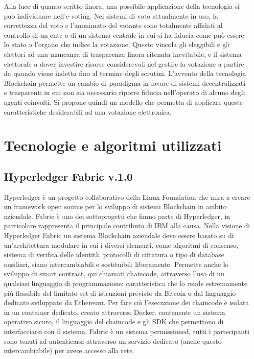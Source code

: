 Alla luce di quanto scritto finora, una possibile applicazione della tecnologia si può individuare nell'e-voting. Nei sistemi di voto attualmente in uso, la correttezza del voto e l’anonimato del votante sono totalmente affidati al controllo di un ente o di un sistema centrale in cui si ha fiducia come può essere lo stato o l'organo che indice la votazione. Questo vincola gli eleggibili e gli elettori ad una mancanza di trasparenza finora ritenuta inevitabile, e il sistema elettorale a dover investire risorse considerevoli nel gestire la votazione a partire da quando viene indetta fino al termine degli scrutini. L’avvento della tecnologia Blockchain permette un cambio di paradigma in favore di sistemi decentralizzati e trasparenti in cui non sia necessario riporre fiducia nell’operato di alcuno degli agenti coinvolti. Si propone quindi un modello che permetta di applicare queste caratteristiche desiderabili ad una votazione elettronica.

\section{Tecnologie e algoritmi utilizzati}
	\subsection{Hyperledger Fabric v.1.0}
		Hyperledger è un progetto collaborativo della Linux Foundation che mira a creare un framework open source per lo sviluppo di sistemi Blockchain in ambito aziendale. Fabric è uno dei sottoprogetti che fanno parte di Hyperledger, in particolare rappresenta il principale contributo di IBM alla causa. Nella visione di Hyperledger Fabric un sistema Blockchain aziendale deve essere basato su di un'architettura modulare in cui i diversi elementi, come algoritmi di consenso, sistema di verifica delle identità, protocolli di cifratura o tipo di database ausiliari, siano intercambiabili e sostituibili liberamente. Permette anche lo sviluppo di smart contract, qui chiamati chaincode, attraverso l'uso di un qualsiasi linguaggio di programmazione: caratteristica che lo rende estremamente più flessibile del limitato set di istruzioni previsto da Bitcoin o dal linguaggio dedicato sviluppato da Ethereum. Per fare ciò l'esecuzione dei chaincode è isolata in un container dedicato, creato attraverso Docker, contenente un sistema operativo sicuro, il linguaggio del chaincode e gli SDK che permettono di interfacciarsi con il sistema. Fabric è un sistema permissioned, tutti i partecipanti sono tenuti ad autenticarsi attraverso un servizio dedicato (anche questo intercambiabile) per avere accesso alla rete. 
